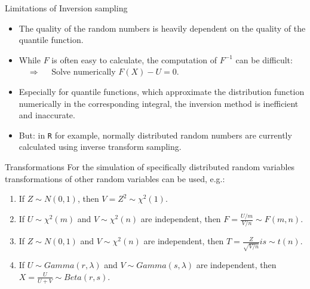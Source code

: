 \documentclass[11pt,compress,t,notes=noshow, xcolor=table]{beamer}
\begin{document}
\begin{vbframe}{Limitations of Inversion sampling}
\begin{itemize}
  \item The quality of the random numbers is heavily dependent on the quality of the quantile function.
  \item While $F$ is often easy to calculate, the computation of $F^{-1}$ can be difficult:
\\ $\quad \Rightarrow \quad$ Solve numerically $F(X) - U = 0$.
  \item Especially for quantile functions, which approximate the distribution function numerically in the corresponding integral, the inversion method is inefficient and inaccurate.
 \item But: in \texttt{R} for example, normally distributed random numbers are currently calculated using inverse transform sampling.
\end{itemize}
\end{vbframe}

\begin{vbframe}{Transformations} %
For the simulation of specifically distributed random variables transformations of other random variables can be used, e.g.:
\lz
\begin{enumerate}
\item If $Z \sim N(0,1)$, then $V=Z^2 \sim \chi^2(1)$.
\item If $U \sim \chi^2(m)$ and $V \sim \chi^2(n)$ are independent, then $F=\frac{U/m}{V/n} \sim F(m,n)$.
\item If $Z \sim N(0,1)$ and $V \sim \chi^2(n)$ are independent, then $T=\frac{Z}{\sqrt{V/n}} is \sim t(n)$.
\item If $U \sim Gamma(r, \lambda)$ and $V \sim Gamma(s, \lambda)$ are independent, then $X=\frac{U}{U+V} \sim Beta(r,s)$.
\end{enumerate}
\end{vbframe}



\end{document}
